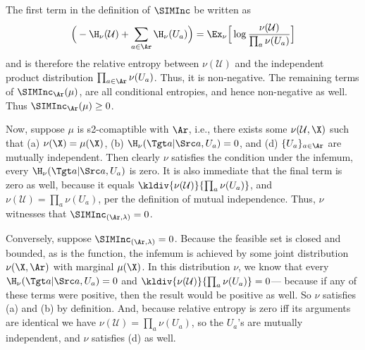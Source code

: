 \begin{subappendices}
\begin{lproof}\label{proof:sinc-nonneg-s2}
    The first term in the definition of $\SIMInc$ be written as
    \[
        \Big( - \H_\nu(\mathcal U) + \sum_{a \in \Ar} \H_\nu(U_a)  \Big)
            = \Ex_{\nu} \Big[ \log \frac{\nu(\mathcal U)}{\prod_{a} \nu(U_a)} \Big]
    \]
    and is therefore the relative entropy between $\nu(\mathcal U)$ and 
    the independent product distribution $\prod_{a \in \Ar}\nu(U_a)$. 
    Thus, it is non-negative.
    The remaining terms of $\SIMInc_{\Ar}(\mu)$, are all conditional entropies, and hence non-negative as well.
    Thus $\SIMInc_{\Ar}(\mu) \ge 0$. 
    
    Now, suppose $\mu$ is s2-comaptible with $\Ar$, i.e., there exists
    some $\nu(\mathcal U, \X)$ such that 
    (a) $\nu(\X) = \mu(\X)$,
    (b) $\H_\nu(\Tgt a | \Src a, U_a) = 0$,
    and (d) $\{U_a\}_{a \in \Ar}$ are mutually independent.
    Then clearly $\nu$ satisfies the condition under the infemum,
    every $\H_\nu(\Tgt a | \Src a, U_a)$ is zero.
    It is also immediate that the final term is zero as well, because it equals
    $\kldiv{\nu(\mathcal U)}{\prod_a \nu(U_a)}$, and 
    $\nu(\mathcal U) = \prod_a \nu(U_a)$, per the definition of mutual independence.
    Thus, $\nu$ witnesses that $\SIMInc_{(\Ar, \lambda)} = 0$. 
    
    Conversely, suppose $\SIMInc_{(\Ar, \lambda)} = 0$.
    Because the feasible set is closed and bounded, as is the function,
    the infemum is achieved by some joint distribution $\nu(\X, \Ar)$ with marginal $\mu(\X)$.
    In this distribution $\nu$, we know that every $\H_\nu(\Tgt a | \Src a, U_a) = 0$
    and $\kldiv{\nu(\mathcal U)}{\prod_a \nu(U_a)} = 0$---
    because if any of these terms were positive, then the result
        would be positive as well.
    So $\nu$ satisfies (a) and (b) by definition. 
    And, because relative entropy is zero iff its arguments are identical
        we have $\nu(\mathcal U) = \prod_a \nu(U_a)$, so the $U_a$'s are mutually
        independent, and $\nu$ satisfies (d) as well.
\end{lproof}



\end{subappendices}
